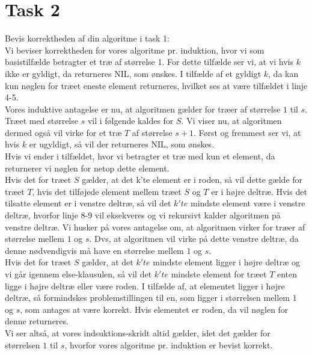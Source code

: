 \section{Task 2}

Bevis korrektheden af din algoritme i task 1:\\

Vi beviser korrektheden for vores algoritme pr. induktion, hvor vi som basistilfælde betragter et træ af størrelse 1. For dette tilfælde ser vi, at vi hvis $k$ ikke er gyldigt, da returneres NIL, som ønskes. I tilfælde af et gyldigt $k$, da kan kun nøglen for træet eneste element returneres, hvilket ses at være tilfældet i linje 4-5.\\
Vores induktive antagelse er nu, at algoritmen gælder for træer af størrelse $1$ til $s$. Træet med størrelse $s$ vil i følgende kaldes for $S$.
Vi viser nu, at algoritmen dermed også vil virke for et træ $T$ af størrelse $s+1$.
Først og fremmest ser vi, at hvis $k$ er ugyldigt, så vil der returneres NIL, som ønskes.\\
Hvis vi ender i tilfældet, hvor vi betragter et træ med kun et element, da returnerer vi nøglen for netop dette element.\\
Hvis det for træet $S$ gælder, at det k'te element er i roden, så vil dette gælde for træet $T$, hvis det tilføjede element mellem træet $S$ og $T$ er i højre deltræ. Hvis det tilsatte element er i venstre deltræ, så vil det $k'te$ mindste element være i venstre deltræ, hvorfor linje 8-9 vil eksekveres og vi rekursivt kalder algoritmen på venstre deltræ. Vi husker på vores antagelse om, at algoritmen virker for træer af størrelse mellem $1$ og $s$. Dvs, at algoritmen vil virke på dette venstre deltræ, da denne nødvendigvis må have en størrelse mellem $1$ og $s$. \\
Hvis det for træet $S$ gælder, at det $k'te$ mindste element ligger i højre deltræ og vi går igennem else-klausulen, så vil det $k'te$ mindste element for træet $T$ enten ligge i højre deltræ eller være roden. I tilfælde af, at elementet ligger i højre deltræ, så formindskes problemstillingen til en, som ligger i størrelsen mellem $1$ og $s$, som antages at være korrekt. Hvis elementet er roden, da vil nøglen for denne returneres.\\
Vi ser altså, at vores indsuktions-skridt altid gælder, idet det gælder for størrelsen $1$ til $s$, hvorfor vores algoritme pr. induktion er bevist korrekt. 

